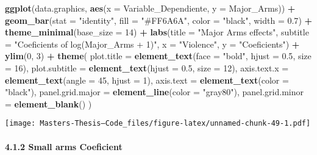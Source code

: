\documentclass[
  11pt,
]{article}
\newenvironment{Shaded}{\begin{snugshade}}{\end{snugshade}}
\newcommand{\AttributeTok}[1]{\textcolor[rgb]{0.13,0.29,0.53}{#1}}
\newcommand{\DecValTok}[1]{\textcolor[rgb]{0.00,0.00,0.81}{#1}}
\newcommand{\FloatTok}[1]{\textcolor[rgb]{0.00,0.00,0.81}{#1}}
\newcommand{\FunctionTok}[1]{\textcolor[rgb]{0.13,0.29,0.53}{\textbf{#1}}}
\newcommand{\NormalTok}[1]{#1}
\newcommand{\SpecialCharTok}[1]{\textcolor[rgb]{0.81,0.36,0.00}{\textbf{#1}}}
\newcommand{\StringTok}[1]{\textcolor[rgb]{0.31,0.60,0.02}{#1}}
\begin{document}
\begin{Shaded}
\begin{Highlighting}[]
\FunctionTok{ggplot}\NormalTok{(data.graphics, }\FunctionTok{aes}\NormalTok{(}\AttributeTok{x =}\NormalTok{ Variable\_Dependiente, }\AttributeTok{y =}\NormalTok{ Major\_Arms)) }\SpecialCharTok{+}
  \FunctionTok{geom\_bar}\NormalTok{(}\AttributeTok{stat =} \StringTok{"identity"}\NormalTok{, }\AttributeTok{fill =} \StringTok{"\#FF6A6A"}\NormalTok{, }\AttributeTok{color =} \StringTok{"black"}\NormalTok{, }\AttributeTok{width =} \FloatTok{0.7}\NormalTok{) }\SpecialCharTok{+}
  \FunctionTok{theme\_minimal}\NormalTok{(}\AttributeTok{base\_size =} \DecValTok{14}\NormalTok{) }\SpecialCharTok{+}
  \FunctionTok{labs}\NormalTok{(}\AttributeTok{title =} \StringTok{"Major Arms effects"}\NormalTok{,}
       \AttributeTok{subtitle =} \StringTok{"Coeficients of log(Major\_Arms + 1)"}\NormalTok{,}
       \AttributeTok{x =} \StringTok{"Violence"}\NormalTok{,}
       \AttributeTok{y =} \StringTok{"Coeficients"}\NormalTok{) }\SpecialCharTok{+}
  \FunctionTok{ylim}\NormalTok{(}\DecValTok{0}\NormalTok{, }\DecValTok{3}\NormalTok{) }\SpecialCharTok{+}
  \FunctionTok{theme}\NormalTok{(}
    \AttributeTok{plot.title =} \FunctionTok{element\_text}\NormalTok{(}\AttributeTok{face =} \StringTok{"bold"}\NormalTok{, }\AttributeTok{hjust =} \FloatTok{0.5}\NormalTok{, }\AttributeTok{size =} \DecValTok{16}\NormalTok{),}
    \AttributeTok{plot.subtitle =} \FunctionTok{element\_text}\NormalTok{(}\AttributeTok{hjust =} \FloatTok{0.5}\NormalTok{, }\AttributeTok{size =} \DecValTok{12}\NormalTok{),}
    \AttributeTok{axis.text.x =} \FunctionTok{element\_text}\NormalTok{(}\AttributeTok{angle =} \DecValTok{45}\NormalTok{, }\AttributeTok{hjust =} \DecValTok{1}\NormalTok{),}
    \AttributeTok{axis.text =} \FunctionTok{element\_text}\NormalTok{(}\AttributeTok{color =} \StringTok{"black"}\NormalTok{),}
    \AttributeTok{panel.grid.major =} \FunctionTok{element\_line}\NormalTok{(}\AttributeTok{color =} \StringTok{"gray80"}\NormalTok{),}
    \AttributeTok{panel.grid.minor =} \FunctionTok{element\_blank}\NormalTok{()}
\NormalTok{  )}
\end{Highlighting}
\end{Shaded}

\texttt{[image: Masters-Thesis--Code\_files/figure-latex/unnamed-chunk-49-1.pdf]}

\paragraph{4.1.2 Small arms Coeficient}\label{small-arms-coeficient}
\end{document}
